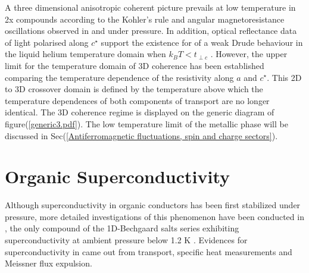 \documentclass[11pt]{article} %
\begin{document}
A three dimensional anisotropic coherent picture  prevails  at low temperature in \tms2x compounds  according
to  the Kohler's rule \cite{Cooper86} and  angular magnetoresistance oscillations observed in \tmc and  under pressure\cite{Kang92,Osada91,Danner94,Sugawara06}. In addition, optical reflectance data of light polarised along $c^{\star}$ support the existence for \tmc of a weak Drude behaviour in the liquid helium temperature domain when $k_{B}T<t_{\perp c}$ \cite{Henderson99}.
However, the upper limit for the temperature domain of 3D coherence has been established comparing the temperature dependence of the resistivity along $a$ and  $c^{\star}$. This  2D to 3D crossover domain is defined by the temperature above which the  temperature dependences of both components of transport are no longer identical\cite{Auban11a}. 
The 3D coherence  regime is displayed on the generic diagram of  figure(\ref{generic3.pdf}). The low temperature limit of the metallic phase will be discussed in Sec(\ref{Antiferromagnetic fluctuations, spin and charge sectors}).

 
\section{Organic Superconductivity}
Although   superconductivity in organic conductors  has been first stabilized  under pressure, more detailed investigations of  this phenomenon have been conducted in \tmc, the only compound of the 1D-Bechgaard salts series exhibiting superconductivity at ambient pressure below 1.2 K .
Evidences for superconductivity in \tmc came out from transport\cite{Bechgaard81}, specific heat measurements\cite{Garoche82} and Meissner flux expulsion\cite{Mailly82}.
\end{document}
